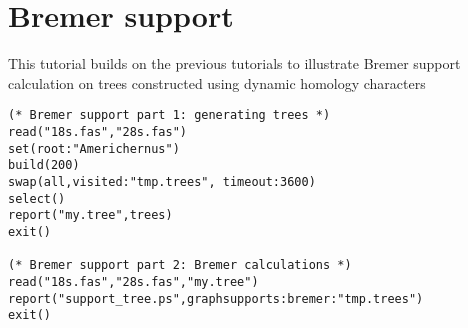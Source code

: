 \section{Bremer support}{\label{tutorial4.3}}

This tutorial builds on the previous tutorials to illustrate Bremer support 
calculation on trees constructed using dynamic homology characters
    
   \begin{verbatim}
(* Bremer support part 1: generating trees *)
read("18s.fas","28s.fas")
set(root:"Americhernus")
build(200)
swap(all,visited:"tmp.trees", timeout:3600)
select()
report("my.tree",trees)
exit()

(* Bremer support part 2: Bremer calculations *)
read("18s.fas","28s.fas","my.tree")
report("support_tree.ps",graphsupports:bremer:"tmp.trees")
exit()
\end{verbatim}

